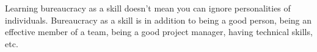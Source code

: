 

Learning bureaucracy as a skill doesn't mean you can ignore personalities of individuals. Bureaucracy as a skill is in addition to being a good person, being an effective member of a team, being a good project manager, having technical skills, etc. 